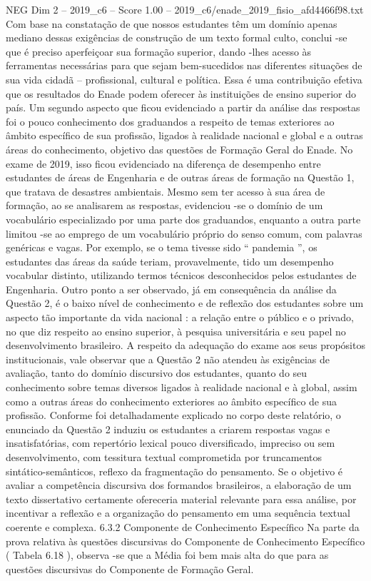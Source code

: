 \begin{textsample}{NEG Dim 2 – 2019\_c6 – Score 1.00 – 2019\_c6/enade\_2019\_fisio\_afd4466f98.txt}
Com base na constatação de que nossos estudantes têm um domínio apenas mediano dessas exigências de construção de um texto formal culto, conclui -se que é preciso aperfeiçoar sua formação superior, dando -lhes acesso às ferramentas necessárias para que sejam bem-sucedidos nas diferentes situações de sua vida cidadã – profissional, cultural e política.
Essa é uma contribuição efetiva que os resultados do Enade podem oferecer às instituições de ensino superior do país.
Um segundo aspecto que ficou evidenciado a partir da análise das respostas foi o pouco conhecimento dos graduandos a respeito de temas exteriores ao âmbito específico de sua profissão, ligados à realidade nacional e global e a outras áreas do conhecimento, objetivo das questões de Formação Geral do Enade.
No exame de 2019, isso ficou evidenciado na diferença de desempenho entre estudantes de áreas de Engenharia e de outras áreas de formação na Questão 1, que tratava de desastres ambientais.
Mesmo sem ter acesso à sua área de formação, ao se analisarem as respostas, evidenciou -se o domínio de um vocabulário especializado por uma parte dos graduandos, enquanto a outra parte limitou -se ao emprego de um vocabulário próprio do senso comum, com palavras genéricas e vagas.
Por exemplo, se o tema tivesse sido “ pandemia ”, os estudantes das áreas da saúde teriam, provavelmente, tido um desempenho vocabular distinto, utilizando termos técnicos desconhecidos pelos estudantes de Engenharia.
Outro ponto a ser observado, já em consequência da análise da Questão 2, é o baixo nível de conhecimento e de reflexão dos estudantes sobre um aspecto tão importante da vida nacional : a relação entre o público e o privado, no que diz respeito ao ensino superior, à pesquisa universitária e seu papel no desenvolvimento brasileiro.
A respeito da adequação do exame aos seus propósitos institucionais, vale observar que a Questão 2 não atendeu às exigências de avaliação, tanto do domínio discursivo dos estudantes, quanto do seu conhecimento sobre temas diversos ligados à realidade nacional e à global, assim como a outras áreas do conhecimento exteriores ao âmbito específico de sua profissão.
Conforme foi detalhadamente explicado no corpo deste relatório, o enunciado da Questão 2 induziu os estudantes a criarem respostas vagas e insatisfatórias, com repertório lexical pouco diversificado, impreciso ou sem desenvolvimento, com tessitura textual comprometida por truncamentos sintático-semânticos, reflexo da fragmentação do pensamento.
Se o objetivo é avaliar a competência discursiva dos formandos brasileiros, a elaboração de um texto dissertativo certamente ofereceria material relevante para essa análise, por incentivar a reflexão e a organização do pensamento em uma sequência textual coerente e complexa. 6.3.2 Componente de Conhecimento Específico Na parte da prova relativa às questões discursivas do Componente de Conhecimento Específico ( Tabela 6.18 ), observa -se que a Média foi bem mais alta do que para as questões discursivas do Componente de Formação Geral.

\end{textsample}
